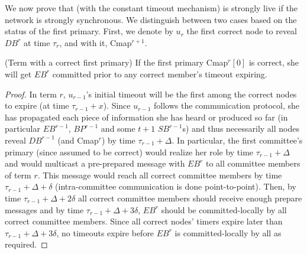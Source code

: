 We now prove that \name (with the constant timeout mechanism) is strongly live if the network is strongly synchronous. We distinguish between two cases based on the status of the first primary. First, we denote by $u_r$ the first correct node to reveal $DB^r$ at time $\tau_r$, and with it, Cmap$^{r+1}$.
\begin{lemma}{(Term with a correct first primary)}
If the first primary Cmap$^r[0]$ is correct, she will get $EB^r$ committed prior to any correct member’s timeout expiring.
\end{lemma}
\begin{proof}
In term $r$, $u_{r-1}$'s initial timeout will be the first among the correct nodes to expire (at time $\tau_{r-1}+x$). Since $u_{r-1}$ follows the communication protocol, she has propagated each piece of information she has heard or produced so far (in particular $EB^{r-1}$, $BP^{r-1}$ and some $t+1$ $SB^{r-1}$s) and thus necessarily  all nodes reveal $DB^{r-1}$ (and Cmap$^r$) by time $\tau_{r-1}+\Delta$. In particular, the first committee's primary (since assumed to be correct) would realize her role by time $\tau_{r-1}+\Delta$ and would multicast a pre-prepared message with $EB^r$ to all committee members of term $r$. This message would reach all correct committee members by time $\tau_{r-1}+\Delta+\delta$ (intra-committee communication is done point-to-point).
Then, by time $\tau_{r-1}+\Delta+2 \delta$ all correct committee members should receive enough prepare messages and by time $\tau_{r-1}+\Delta+3 \delta$, $EB^r$ should be committed-locally by all correct committee members. Since all correct nodes' timers expire later than $\tau_{r-1}+\Delta+3 \delta$, no timeouts expire before $EB^r$ is committed-locally by all as required.
\end{proof}

